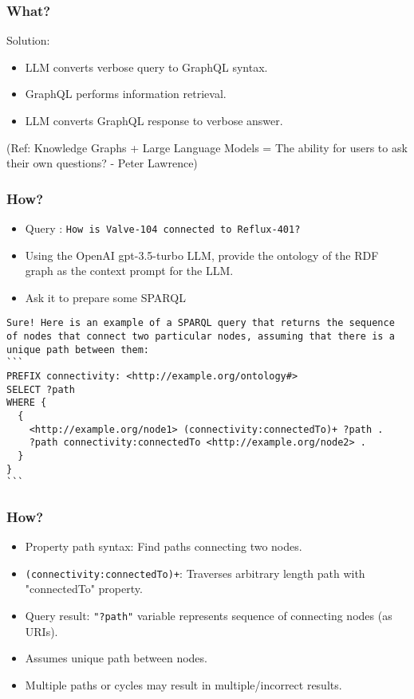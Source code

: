 \begin{frame}[fragile]\frametitle{What?}

Solution: 

\begin{itemize}
\item LLM converts verbose query to GraphQL syntax.
\item GraphQL performs information retrieval.
\item LLM converts GraphQL response to verbose answer.
\end{itemize}

	
{\tiny (Ref: Knowledge Graphs + Large Language Models = The ability for users to ask their own questions? - Peter Lawrence)}

\end{frame}

\begin{frame}[fragile]\frametitle{How?}

\begin{itemize}
\item Query : \lstinline|How is Valve-104 connected to Reflux-401?|
\item Using the OpenAI gpt-3.5-turbo LLM, provide the ontology of the RDF graph as the context prompt for the LLM.
\item Ask it to prepare some SPARQL
\end{itemize}	

\begin{lstlisting}
Sure! Here is an example of a SPARQL query that returns the sequence of nodes that connect two particular nodes, assuming that there is a unique path between them:
```
PREFIX connectivity: <http://example.org/ontology#>
SELECT ?path
WHERE {
  {
    <http://example.org/node1> (connectivity:connectedTo)+ ?path .
    ?path connectivity:connectedTo <http://example.org/node2> .
  }
}
```
\end{lstlisting}

\end{frame}

\begin{frame}[fragile]\frametitle{How?}

\begin{itemize}
\item Property path syntax: Find paths connecting two nodes.
\item \lstinline|(connectivity:connectedTo)+|: Traverses arbitrary length path with "connectedTo" property.
\item Query result: \lstinline|"?path"| variable represents sequence of connecting nodes (as URIs).
\item Assumes unique path between nodes.
\item Multiple paths or cycles may result in multiple/incorrect results.
\end{itemize}	

\end{frame}


